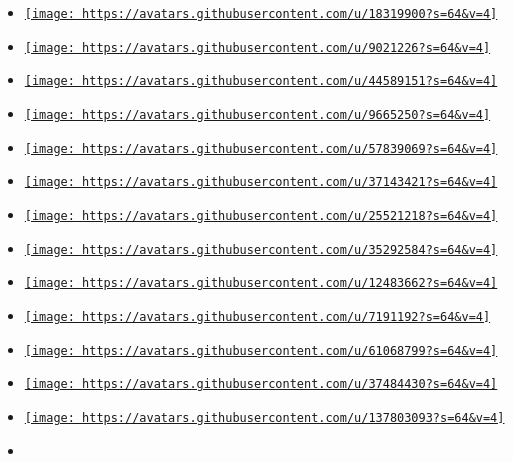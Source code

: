 \begin{itemize}
\tightlist
\item
  \href{https://github.com/Leedehai}{\texttt{[image: https://avatars.githubusercontent.com/u/18319900?s=64\&v=4]}}
\item
  \href{https://github.com/PgBiel}{\texttt{[image: https://avatars.githubusercontent.com/u/9021226?s=64\&v=4]}}
\item
  \href{https://github.com/frozolotl}{\texttt{[image: https://avatars.githubusercontent.com/u/44589151?s=64\&v=4]}}
\item
  \href{https://github.com/Dherse}{\texttt{[image: https://avatars.githubusercontent.com/u/9665250?s=64\&v=4]}}
\item
  \href{https://github.com/MDLC01}{\texttt{[image: https://avatars.githubusercontent.com/u/57839069?s=64\&v=4]}}
\item
  \href{https://github.com/Andrew15-5}{\texttt{[image: https://avatars.githubusercontent.com/u/37143421?s=64\&v=4]}}
\item
  \href{https://github.com/Enter-tainer}{\texttt{[image: https://avatars.githubusercontent.com/u/25521218?s=64\&v=4]}}
\item
  \href{https://github.com/Myriad-Dreamin}{\texttt{[image: https://avatars.githubusercontent.com/u/35292584?s=64\&v=4]}}
\item
  \href{https://github.com/peng1999}{\texttt{[image: https://avatars.githubusercontent.com/u/12483662?s=64\&v=4]}}
\item
  \href{https://github.com/EpicEricEE}{\texttt{[image: https://avatars.githubusercontent.com/u/7191192?s=64\&v=4]}}
\item
  \href{https://github.com/jcbhmr}{\texttt{[image: https://avatars.githubusercontent.com/u/61068799?s=64\&v=4]}}
\item
  \href{https://github.com/Heinenen}{\texttt{[image: https://avatars.githubusercontent.com/u/37484430?s=64\&v=4]}}
\item
  \href{https://github.com/tingerrr}{\texttt{[image: https://avatars.githubusercontent.com/u/137803093?s=64\&v=4]}}
\item

\end{itemize}
